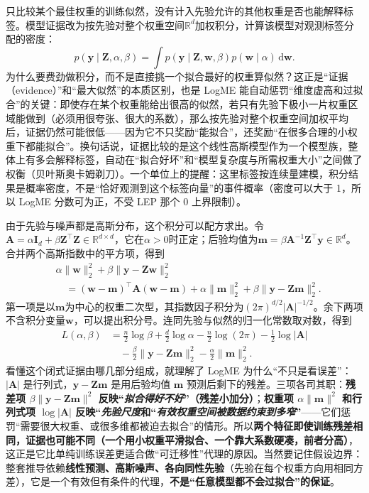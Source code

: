 只比较某个最佳权重的训练似然，没有计入先验允许的其他权重是否也能解释标签。模型证据改为按先验对整个权重空间$\mathbb R^d$加权积分，计算该模型对观测标签分配的密度：
\begin{equation}
  p(\bm y\mid\bm Z,\alpha,\beta)
  =\int p(\bm y\mid\bm Z,\bm w,\beta)
       p(\bm w\mid\alpha)\,\mathrm d\bm w.
  \label{eq:ket-reuse-logme-evidence}
\end{equation}
为什么要费劲做积分，而不是直接挑一个拟合最好的权重算似然？这正是“证据（evidence）”和“最大似然”的本质区别，也是 LogME 能自动惩罚“维度虚高和过拟合”的关键：即使存在某个权重能给出很高的似然，若只有先验下极小一片权重区域能做到（必须用很夸张、很大的系数），那么按先验对整个权重空间加权平均后，证据仍然可能很低——因为它不只奖励“能拟合”，还奖励“在很多合理的小权重下都能拟合”。换句话说，证据比较的是这个线性高斯模型作为一个模型族，整体上有多会解释标签，自动在“拟合好坏”和“模型复杂度与所需权重大小”之间做了权衡（贝叶斯奥卡姆剃刀）。一个单位上的提醒：这里标签按连续量建模，积分结果是概率密度，不是“恰好观测到这个标签向量”的事件概率（密度可以大于 1，所以 LogME 分数可为正，不受 LEP 那个 0 上界限制）。

由于先验与噪声都是高斯分布，这个积分可以配方求出。令$\bm A=\alpha\bm I_d+\beta\bm Z^\top\bm Z\in\mathbb R^{d\times d}$，它在$\alpha>0$时正定；后验均值为$\bm m=\beta\bm A^{-1}\bm Z^\top\bm y\in\mathbb R^d$。合并两个高斯指数中的平方项，得到
\[
  \begin{aligned}
    &\alpha\lVert\bm w\rVert_2^2+
      \beta\lVert\bm y-\bm Z\bm w\rVert_2^2\\
    &\quad=(\bm w-\bm m)^\top\bm A(\bm w-\bm m)
       +\alpha\lVert\bm m\rVert_2^2
       +\beta\lVert\bm y-\bm Z\bm m\rVert_2^2.
  \end{aligned}
\]
第一项是以$\bm m$为中心的权重二次型，其指数因子积分为$(2\pi)^{d/2}|\bm A|^{-1/2}$。余下两项不含积分变量$\bm w$，可以提出积分号。连同先验与似然的归一化常数取对数，得到
\begin{equation}
  \begin{aligned}
    L(\alpha,\beta)
    &=\frac n2\log\beta+\frac d2\log\alpha
       -\frac n2\log(2\pi)-\frac12\log|\bm A|\\
    &\quad-\frac\beta2\lVert\bm y-\bm Z\bm m\rVert_2^2
       -\frac\alpha2\lVert\bm m\rVert_2^2.
  \end{aligned}
  \label{eq:ket-reuse-logme-log-evidence}
\end{equation}
看懂这个闭式证据由哪几部分组成，就理解了 LogME 为什么“不只是看误差”：$|\bm A|$ 是行列式，$\bm y-\bm Z\bm m$ 是用后验均值 $\bm m$ 预测后剩下的残差。三项各司其职：\textbf{残差项 $\beta\lVert\bm y-\bm Z\bm m\rVert^2$ 反映“\emph{拟合得好不好}”（残差小加分）}；\textbf{权重项 $\alpha\lVert\bm m\rVert^2$ 和行列式项 $\log|\bm A|$ 反映“\emph{先验尺度}和“\emph{有效权重空间\emph{被数据约束到多窄}}”}——它们惩罚“需要很大权重、或很多维都被迫去拟合”的情形。所以\textbf{两个特征即使训练残差相同，证据也可能不同（一个用小权重平滑拟合、一个靠大系数硬凑，前者分高）}，这正是它比单纯训练误差更适合做“可迁移性”代理的原因。当然要记住假设边界：整套推导依赖\textbf{线性预测、高斯噪声、各向同性先验}（先验在每个权重方向用相同方差），它是一个有效但有条件的代理，\textbf{不是“任意模型都不会过拟合”的保证}。

